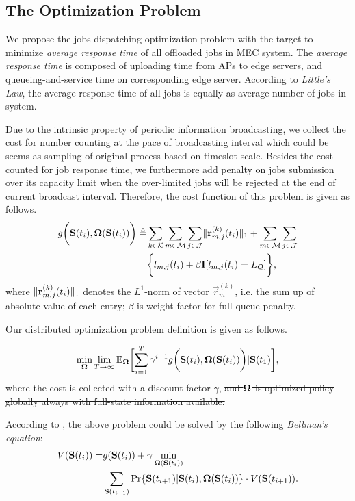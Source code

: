 \subsection{The Optimization Problem}
We propose the jobs dispatching optimization problem with the target to minimize \emph{average response time} of all offloaded jobs in MEC system.
The \emph{average response time} is composed of uploading time from APs to edge servers, and queueing-and-service time on corresponding edge server. According to \emph{Little's Law}, the average response time of all jobs is equally as average number of jobs in system.
        
Due to the intrinsic property of periodic information broadcasting, we collect the cost for number counting at the pace of broadcasting interval which could be seems as sampling of original process based on timeslot scale.
Besides the cost counted for job response time, we furthermore add penalty on jobs submission over its capacity limit when the over-limited jobs will be rejected at the end of current broadcast interval.
Therefore, the cost function of this problem is given as follows.
\begin{align}
    g\bigg(\mathbf{S}(t_{i}), \boldsymbol{\Omega}(\mathbf{S}(t_{i}))\bigg) \triangleq&
    \sum_{k\in\mathcal{K}}\sum_{m\in\mathcal{M}}\sum_{j\in\mathcal{J}} \lVert\mathbf{r}^{(k)}_{m,j}(t_{i})\|_1 + \sum_{m\in\mathcal{M}}\sum_{j\in\mathcal{J}}
    \nonumber\\
    &\bigg\{
        l_{m,j}(t_{i}) + \beta \mathbf{I}[l_{m,j}(t_{i})=L_Q]
    \bigg\},
\end{align}
where $\lVert\mathbf{r}^{(k)}_{m,j}(t_i)\|_1$ denotes the $L^1$-norm of vector $\vec{r}^{(k)}_{m}$, i.e. the sum up of absolute value of each entry; $\beta$ is weight factor for full-queue penalty.
        
Our distributed optimization problem definition is given as follows.
\begin{problem}
    \begin{gather}
        \min_{\Policy} \lim_{T \to \infty}
            \mathbb{E}_{\Policy}
                \Bracket{\sum_{i=1}^{T} \gamma^{i-1} g\Paren{\Stat(t_{i}), \Policy(\Stat(t_{i}))}|\Stat(t_1)},
    \end{gather}
    where the cost is collected with a discount factor $\gamma$, \st{and $\boldsymbol{\Omega}$ is optimized policy globally always with full-state information available.}
\end{problem}
According to \cite{sutton1998introduction}, the above problem could be solved by the following \emph{Bellman's equation}:
\begin{align}
    V(\mathbf{S}(t_i)) = &g(\mathbf{S}(t_i)) + \gamma \min_{\boldsymbol{\Omega}(\mathbf{S}(t_{i}))}
        \nonumber\\
        & \sum_{\mathbf{S}(t_{i+1})} \Pr\{ \mathbf{S}(t_{i+1})|\mathbf{S}(t_{i}), \boldsymbol{\Omega}(\mathbf{S}(t_{i})) \} \cdot V(\mathbf{S}(t_{i+1})).
    \label{sp_0}
\end{align}

